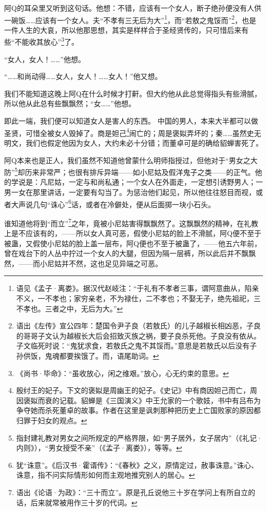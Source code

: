 \documentclass[12pt,UTF8]{ctexbook}
\begin{document}
阿Q的耳朵里又听到这句话。他想：不错，应该有一个女人，断子绝孙便没有人供一碗饭……应该有一个女人。夫“不孝有三无后为大”\footnote{语见《孟子·离娄》。据汉代赵岐注：“于礼有不孝者三事，谓阿意曲从，陷亲不义，一不孝也；家穷亲老，不为禄仕，二不孝也；不娶无子，绝先祖祀，三不孝也。三者之中，无后为大。”}，而“若敖之鬼馁而”\footnote{语出《左传》宣公四年：楚国令尹子良（若敖氏）的儿子越椒长相凶恶，子良的哥哥子文认为越椒长大后会招致灭族之祸，要子良杀死他。子良没有依从。子文临死时说：“鬼犹求食，若敖氏之鬼不其馁而。”意思是若敖氏以后没有子孙供饭，鬼魂都要挨饿了。而，语尾助词。}，也是一件人生的大哀，所以他那思想，其实是样样合于圣经贤传的，只可惜后来有些“不能收其放心”\footnote{《尚书·毕命》：“虽收放心，闲之维艰。”放心，心无约束的意思。}了。

“女人，女人！……”他想。

“……和尚动得……女人，女人！……女人！”他又想。

我们不能知道这晚上阿Q在什么时候才打鼾。但大约他从此总觉得指头有些滑腻，所以他从此总有些飘飘然；“女……”他想。

即此一端，我们便可以知道女人是害人的东西。
中国的男人，本来大半都可以做圣贤，可惜全被女人毁掉了。商是妲己\footnote{殷纣王的妃子。下文的褒姒是周幽王的妃子。《史记》中有商因妲己而亡，周因褒姒而衰的记载。貂蝉是《三国演义》中王允家的一个歌妓，书中有吕布为争夺她而杀死董卓的故事。作者在这里是讽刺那种把历史上亡国败家的原因都归罪于妇女的观点。}闹亡的；周是褒姒弄坏的；秦……虽然史无明文，我们也假定他因为女人，大约未必十分错；而董卓可是的确给貂蝉害死了。

阿Q本来也是正人，我们虽然不知道他曾蒙什么明师指授过，但他对于“男女之大防”\footnote{指封建礼教对男女之间所规定的严格界限，如“男子居外，女子居内”（《礼记·内则》），“男女授受不亲”（《孟子·离娄》），等等。}却历来非常严；也很有排斥异端——如小尼姑及假洋鬼子之类——的正气。他的学说是：凡尼姑，一定与和尚私通；一个女人在外面走，一定想引诱野男人；一男一女在那里讲话，一定要有勾当了。为惩治他们起见，所以他往往怒目而视，或者大声说几句“诛心”\footnote{犹“诛意”。《后汉书·霍谞传》：“《春秋》之义，原情定过，赦事诛意。”诛心、诛意，指不问实际情形如何而主观地推究别人的居心。}话，或者在冷僻处，便从后面掷一块小石头。

谁知道他将到“而立”\footnote{语出《论语·为政》：“三十而立”。原是孔丘说他三十岁在学问上有所自立的话，后来就常被用作三十岁的代词。}之年，竟被小尼姑害得飘飘然了。这飘飘然的精神，在礼教上是不应该有的，——所以女人真可恶，假使小尼姑的脸上不滑腻，阿Q便不至于被蛊，又假使小尼姑的脸上盖一层布，阿Q便也不至于被蛊了，——他五六年前，曾在戏台下的人丛中拧过一个女人的大腿，但因为隔一层裤，所以此后并不飘飘然，——而小尼姑并不然，这也足见异端之可恶。
\end{document}
